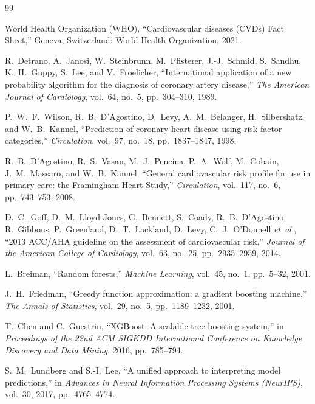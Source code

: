 \documentclass[12pt,a4paper]{report}
\begin{document}
\begin{thebibliography}{99}

World Health Organization (WHO), ``Cardiovascular diseases (CVDs) Fact Sheet,'' Geneva, Switzerland: World Health Organization, 2021.

R.~Detrano, A.~Janosi, W.~Steinbrunn, M.~Pfisterer, J.-J.~Schmid, S.~Sandhu, K.~H.~Guppy, S.~Lee, and V.~Froelicher, ``International application of a new probability algorithm for the diagnosis of coronary artery disease,'' \emph{The American Journal of Cardiology}, vol.~64, no.~5, pp.~304--310, 1989.

P.~W.~F.~Wilson, R.~B.~D'Agostino, D.~Levy, A.~M.~Belanger, H.~Silbershatz, and W.~B.~Kannel, ``Prediction of coronary heart disease using risk factor categories,'' \emph{Circulation}, vol.~97, no.~18, pp.~1837--1847, 1998.

R.~B.~D'Agostino, R.~S.~Vasan, M.~J.~Pencina, P.~A.~Wolf, M.~Cobain, J.~M.~Massaro, and W.~B.~Kannel, ``General cardiovascular risk profile for use in primary care: the Framingham Heart Study,'' \emph{Circulation}, vol.~117, no.~6, pp.~743--753, 2008.

D.~C.~Goff, D.~M.~Lloyd-Jones, G.~Bennett, S.~Coady, R.~B.~D'Agostino, R.~Gibbons, P.~Greenland, D.~T.~Lackland, D.~Levy, C.~J.~O'Donnell \emph{et~al.}, ``2013 ACC/AHA guideline on the assessment of cardiovascular risk,'' \emph{Journal of the American College of Cardiology}, vol.~63, no.~25, pp.~2935--2959, 2014.

L.~Breiman, ``Random forests,'' \emph{Machine Learning}, vol.~45, no.~1, pp.~5--32, 2001.

J.~H.~Friedman, ``Greedy function approximation: a gradient boosting machine,'' \emph{The Annals of Statistics}, vol.~29, no.~5, pp.~1189--1232, 2001.

T.~Chen and C.~Guestrin, ``XGBoost: A scalable tree boosting system,'' in \emph{Proceedings of the 22nd ACM SIGKDD International Conference on Knowledge Discovery and Data Mining}, 2016, pp.~785--794.

S.~M.~Lundberg and S.-I.~Lee, ``A unified approach to interpreting model predictions,'' in \emph{Advances in Neural Information Processing Systems (NeurIPS)}, vol.~30, 2017, pp.~4765--4774.


\end{thebibliography}
\end{document}
